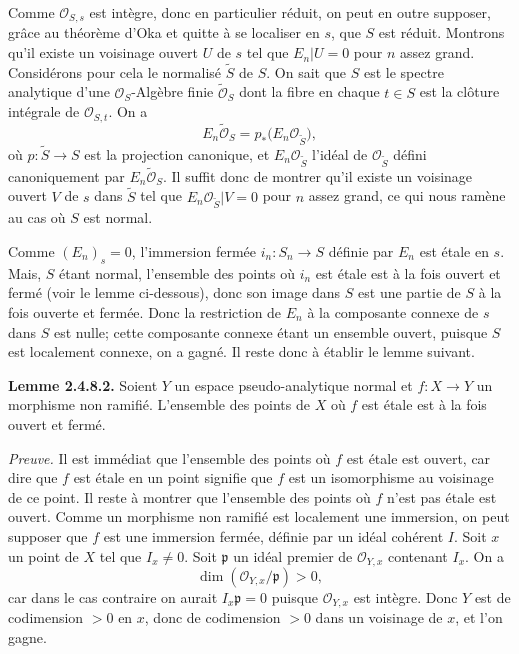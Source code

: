 \documentclass[11pt]{article}
\begin{document}
Comme $\mathcal O_{S,s}$ est intègre, donc en particulier réduit, on peut en outre supposer, grâce au théorème d'Oka et quitte à se localiser en $s$, que $S$ est réduit. Montrons qu'il existe un voisinage ouvert $U$ de $s$ tel que $E_n|U=0$ pour $n$ assez grand. Considérons pour cela le normalisé $\widetilde S$ de $S$. On sait que $S$ est le spectre analytique d'une $\mathcal O_S$-Algèbre finie $\widetilde{\mathcal O}_S$ dont la fibre en chaque $t\in S$ est la clôture intégrale de $\mathcal O_{S,t}$. On a
\[
E_n\widetilde{\mathcal O}_S
 =p_*\bigl(E_n\mathcal O_{\widetilde S}\bigr),
\]
où $p:\widetilde S\to S$ est la projection canonique, et $E_n\mathcal O_{\widetilde S}$ l'idéal de $\mathcal O_{\widetilde S}$ défini canoniquement par $E_n\widetilde{\mathcal O}_S$. Il suffit donc de montrer qu'il existe un voisinage ouvert $V$ de $s$ dans $\widetilde S$ tel que $E_n\mathcal O_{\widetilde S}|V=0$ pour $n$ assez grand, ce qui nous ramène au cas où $S$ est normal.

Comme $(E_n)_s=0$, l'immersion fermée $i_n:S_n\to S$ définie par $E_n$ est étale en $s$. Mais, $S$ étant normal, l'ensemble des points où $i_n$ est étale est à la fois ouvert et fermé (voir le lemme ci-dessous), donc son image dans $S$ est une partie de $S$ à la fois ouverte et fermée. Donc la restriction de $E_n$ à la composante connexe de $s$ dans $S$ est nulle; cette composante connexe étant un ensemble ouvert, puisque $S$ est localement connexe, on a gagné. Il reste donc à établir le lemme suivant.

\textbf{Lemme 2.4.8.2.} Soient $Y$ un espace pseudo-analytique normal et $f:X\to Y$ un morphisme non ramifié. L'ensemble des points de $X$ où $f$ est étale est à la fois ouvert et fermé.

\emph{Preuve.} Il est immédiat que l'ensemble des points où $f$ est étale est ouvert, car dire que $f$ est étale en un point signifie que $f$ est un isomorphisme au voisinage de ce point. Il reste à montrer que l'ensemble des points où $f$ n'est pas étale est ouvert. Comme un morphisme non ramifié est localement une immersion, on peut supposer que $f$ est une immersion fermée, définie par un idéal cohérent $I$. Soit $x$ un point de $X$ tel que $I_x\neq0$. Soit $\mathfrak p$ un idéal premier de $\mathcal O_{Y,x}$ contenant $I_x$. On a
\[
\dim(\mathcal O_{Y,x}/\mathfrak p)>0,
\]
car dans le cas contraire on aurait $I_x\mathfrak p=0$ puisque $\mathcal O_{Y,x}$ est intègre. Donc $Y$ est de codimension $>0$ en $x$, donc de codimension $>0$ dans un voisinage de $x$, et l'on gagne.
\end{document}
